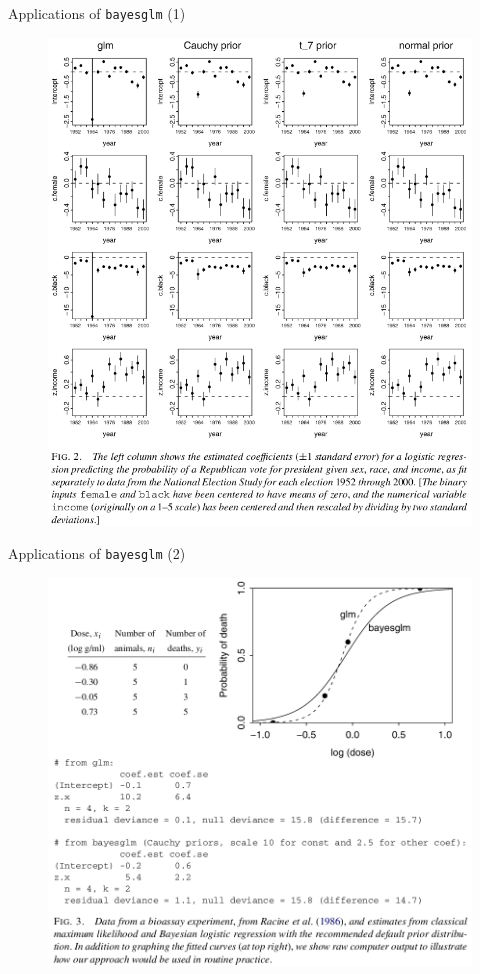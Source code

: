 \documentclass{beamer}
\begin{document}
\begin{frame}{Applications of \texttt{bayesglm} (1)}
	\begin{figure}
		\includegraphics[scale=0.278]{imgs/result1.png}
	\end{figure}
\end{frame}

\begin{frame}{Applications of \texttt{bayesglm} (2)}
	\begin{figure}
		\includegraphics[scale=0.278]{imgs/result2.png}
	\end{figure}
\end{frame}
\end{document}
